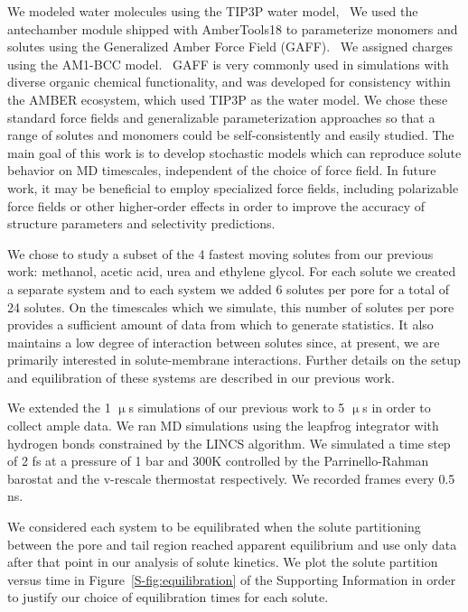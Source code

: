 \documentclass[journal=jctcce,manuscript=article]{achemso}
\begin{document}
  \label{r1_comment2} %
  We modeled water molecules using the TIP3P water model,~\cite{jorgensen_comparison_1983}
  We used the antechamber module shipped with AmberTools18 to parameterize monomers and 
  solutes using the Generalized Amber Force Field (GAFF).~\cite{wang_development_2004} We 
  assigned charges using the AM1-BCC model.~\cite{jakalian_fast_2000,jakalian_fast_2002}
  GAFF is very commonly used in simulations with diverse organic chemical functionality, 
  and was developed for consistency within the AMBER ecosystem, which used TIP3P as the
  water model. We chose these standard force fields and generalizable parameterization 
  approaches so that a range of solutes and monomers could be self-consistently and easily 
  studied. The main goal of this work is to develop stochastic models which can reproduce
  solute behavior on MD timescales, independent of the choice of force field. In future 
  work, it may be beneficial to employ specialized force fields, including polarizable 
  force fields or other higher-order effects in order to improve the accuracy of structure 
  parameters and selectivity predictions.
  
  We chose to study a subset of the 4 fastest moving solutes from our previous
  work: methanol, acetic acid, urea and ethylene glycol. For each solute we 
  created a separate system and to each system we added 6 solutes per pore 
  for a total of 24 solutes. On the timescales which we simulate, this number
  of solutes per pore provides a sufficient amount of data from which to 
  generate statistics. It also maintains a low degree of interaction between
  solutes since, at present, we are primarily interested in solute-membrane 
  interactions. Further details on the setup and equilibration of these systems
  are described in our previous work.\cite{coscia_chemically_2019}
  
  We extended the 1 $\upmu$s simulations of our previous work to 5 $\upmu$s in order
  to collect ample data. We ran MD simulations using the leapfrog integrator with 
  hydrogen bonds constrained by the LINCS algorithm. We simulated a time step of 2 fs at
  a pressure of 1 bar and 300K controlled by the Parrinello-Rahman barostat and
  the v-rescale thermostat respectively. We recorded frames every 0.5 ns.
  
  We considered each system to be equilibrated when the solute partitioning between the 
  pore and tail region reached apparent equilibrium and use only data after that point
  in our analysis of solute kinetics. We plot the solute partition versus time in
  Figure~\ref{S-fig:equilibration} of the Supporting Information in order to justify
  our choice of equilibration times for each solute.
  
\end{document}
